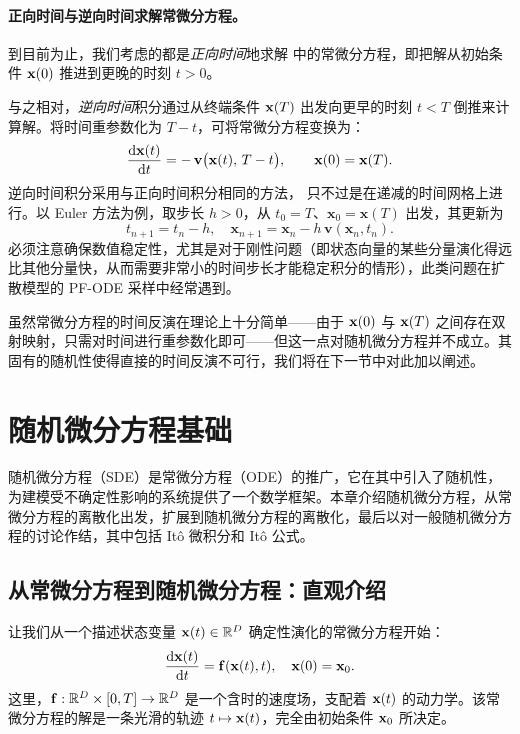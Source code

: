 \paragraph{正向时间与逆向时间求解常微分方程。}
到目前为止，我们考虑的都是\emph{正向时间}地求解  中的常微分方程，即把解从初始条件 ${\mathbf{x}}(0)$ 推进到更晚的时刻 $t > 0$。

与之相对，\emph{逆向时间}积分通过从终端条件 ${\mathbf{x}}(T)$ 出发向更早的时刻 $t < T$ 倒推来计算解。将时间重参数化为 $T - t$，可将常微分方程变换为：
\[
\frac{\mathop{}\!\mathrm{d} \mathbf{x}(t)}{\mathop{}\!\mathrm{d} t}
= -\,\mathbf{v}\big(\mathbf{x}(t),\,T - t\big),
\qquad \mathbf{x}(0)=\mathbf{x}(T).
\]
逆向时间积分采用与正向时间积分相同的方法，
只不过是在递减的时间网格上进行。以 Euler 方法为例，取步长 $h>0$，从
$t_0=T$、$\mathbf{x}_0=\mathbf{x}(T)$ 出发，其更新为
\[
t_{n+1}=t_n-h, \quad
\mathbf{x}_{n+1}=\mathbf{x}_n - h\,\mathbf{v}(\mathbf{x}_n,t_n).
\]
必须注意确保数值稳定性，尤其是对于刚性问题（即状态向量的某些分量演化得远比其他分量快，从而需要非常小的时间步长才能稳定积分的情形），此类问题在扩散模型的 PF-ODE 采样中经常遇到。

虽然常微分方程的时间反演在理论上十分简单——由于 ${\mathbf{x}}(0)$ 与 ${\mathbf{x}}(T)$ 之间存在双射映射，只需对时间进行重参数化即可——但这一点对随机微分方程并不成立。其固有的随机性使得直接的时间反演不可行，我们将在下一节中对此加以阐述。

\newpage
\clearpage


\section{随机微分方程基础}\label{app:sde-intro}

随机微分方程（SDE）是常微分方程（ODE）的推广，它在其中引入了随机性，为建模受不确定性影响的系统提供了一个数学框架。本章介绍随机微分方程，从常微分方程的离散化出发，扩展到随机微分方程的离散化，最后以对一般随机微分方程的讨论作结，其中包括 Itô 微积分和 Itô 公式。

\subsection{从常微分方程到随机微分方程：直观介绍}
让我们从一个描述状态变量 $ {\mathbf{x}}(t) \in \mathbb{R}^D $ 确定性演化的常微分方程开始：
\begin{equation}
    \frac{\mathop{}\!\mathrm{d}{\mathbf{x}}(t)}{\mathop{}\!\mathrm{d} t} = {\mathbf{f}}({\mathbf{x}}(t), t), \quad {\mathbf{x}}(0) = {\mathbf{x}}_0.
    \label{eq:ode}
\end{equation}
这里，$ {\mathbf{f}}: \mathbb{R}^D \times [0,T] \rightarrow \mathbb{R}^D $ 是一个含时的速度场，支配着 $ {\mathbf{x}}(t) $ 的动力学。该常微分方程的解是一条光滑的轨迹 $ t \mapsto {\mathbf{x}}(t) $，完全由初始条件 $ {\mathbf{x}}_0 $ 所决定。

